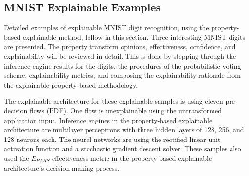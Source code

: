 
\subsection{MNIST Explainable Examples}
\label{sec:mnist_exp_prop_examples}

Detailed examples of explainable MNIST digit recognition, using the
property-based explainable method, follow in this section. Three interesting
MNIST digits are presented.  The property transform opinions, effectiveness,
confidence, and explainability will be reviewed in detail.  This is done by
stepping through the inference engine results for the digits, the procedures of
the probabilistic voting scheme, explainability metrics, and composing the
explainability rationale from the explainable property-based methodology.

The explainable architecture for these explainable samples is using eleven
pre-decision flows (PDF).  One flow is unexplainable using the untransformed
application input. Inference engines in the property-based explainable
architecture are multilayer perceptrons with three hidden layers of 128, 256,
and 128 neurons each. The neural networks are using the rectified linear unit
activation function and a stochastic gradient descent solver. These samples also
used the $E_{PARS}$ effectiveness metric in the property-based explainable
architecture's decision-making process.

